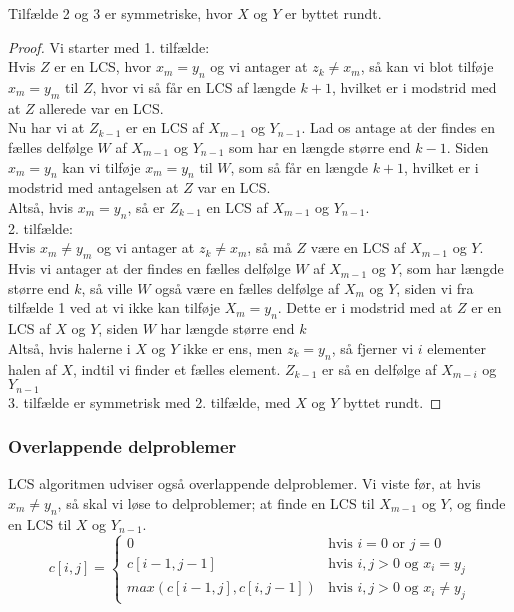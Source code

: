 Tilfælde 2 og 3 er symmetriske, hvor $X$ og $Y$ er byttet rundt.\\
\begin{proof}
Vi starter med 1. tilfælde:\\
Hvis $Z$ er en LCS, hvor $x_m = y_n$ og vi antager at $z_k \neq x_m$, så kan vi blot tilføje $x_m = y_m$ til $Z$, hvor vi så får en LCS af længde $k + 1$, hvilket er i modstrid med at $Z$ allerede var en LCS.\\
Nu har vi at $Z_{k-1}$ er en LCS af $X_{m-1}$ og $Y_{n-1}$. Lad os antage at der findes en fælles delfølge $W$ af $X_{m-1}$ og $Y_{n-1}$ som har en længde større end $k - 1$. Siden $x_m = y_n$ kan vi tilføje $x_m = y_n$ til $W$, som så får en længde $k + 1$, hvilket er i modstrid med antagelsen at $Z$ var en LCS.\\
Altså, hvis $x_m = y_n$, så er $Z_{k-1}$ en LCS af $X_{m-1}$ og $Y_{n-1}$.\\

2. tilfælde:\\
Hvis $x_m \neq y_m$ og vi antager at $z_k \neq x_m$, så må $Z$ være en LCS af $X_{m-1}$ og $Y$.\\
Hvis vi antager at der findes en fælles delfølge $W$ af $X_{m-1}$ og $Y$, som har længde større end $k$, så ville $W$ også være en fælles delfølge af $X_m$ og $Y$, siden vi fra tilfælde 1 ved at vi ikke kan tilføje $X_m=y_n$. Dette er i modstrid med at $Z$ er en LCS af $X$ og $Y$, siden $W$ har længde større end $k$\\
Altså, hvis halerne i $X$ og $Y$ ikke er ens, men $z_k=y_n$, så fjerner vi $i$ elementer halen af $X$, indtil vi finder et fælles element. $Z_{k-1}$ er så en delfølge af $X_{m-i}$ og $Y_{n-1}$\\

3. tilfælde er symmetrisk med 2. tilfælde, med $X$ og $Y$ byttet rundt.
\end{proof}

\subsubsection{Overlappende delproblemer}
LCS algoritmen udviser også overlappende delproblemer. Vi viste før, at hvis $x_m \neq y_n$, så skal vi løse to delproblemer; at finde en LCS til $X_{m-1}$ og $Y$, og finde en LCS til $X$ og $Y_{n-1}$.
\begin{equation}
  c[i,j] = 
  \begin{cases}
    0 & \text{hvis } i=0 \text{ or } j=0\\
    c[i-1, j-1] & \text{hvis } i,j > 0 \text{ og } x_i = y_j\\
    max(c[i-1, j], c[i, j-1]) & \text{hvis } i,j > 0 \text{ og } x_i \neq y_j
  \end{cases}
\end{equation}

